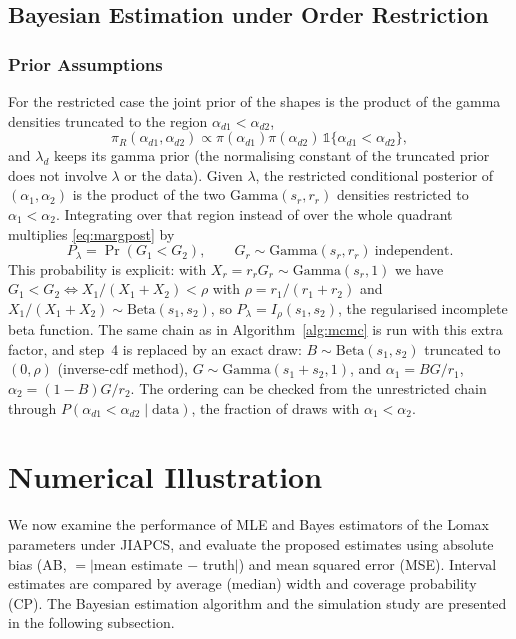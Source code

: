 \documentclass[a4paper,11pt]{article}
\begin{document}
\subsection{Bayesian Estimation under Order Restriction}\label{sec:restbayes}
\subsubsection{Prior Assumptions}
For the restricted case the joint prior of the shapes is the product of the gamma densities truncated to the region $\alpha_{d1}<\alpha_{d2}$,
\[
\pi_R(\alpha_{d1},\alpha_{d2})\propto\pi(\alpha_{d1})\pi(\alpha_{d2})\,\mathbb 1\{\alpha_{d1}<\alpha_{d2}\},
\]
and $\lambda_d$ keeps its gamma prior (the normalising constant of the truncated prior does not involve $\lambda$ or the data). Given $\lambda$, the restricted conditional posterior of $(\alpha_1,\alpha_2)$ is the product of the two $\mathrm{Gamma}(s_r,r_r)$ densities restricted to $\alpha_1<\alpha_2$. Integrating over that region instead of over the whole quadrant multiplies \eqref{eq:margpost} by
\[
P_\lambda=\Pr(G_1<G_2),\qquad G_r\sim\mathrm{Gamma}(s_r,r_r)\ \text{independent}.
\]
This probability is explicit: with $X_r=r_rG_r\sim\mathrm{Gamma}(s_r,1)$ we have $G_1<G_2\iff X_1/(X_1+X_2)<\rho$ with $\rho=r_1/(r_1+r_2)$ and $X_1/(X_1+X_2)\sim\mathrm{Beta}(s_1,s_2)$, so $P_\lambda=I_\rho(s_1,s_2)$, the regularised incomplete beta function. The same chain as in Algorithm~\ref{alg:mcmc} is run with this extra factor, and step~4 is replaced by an exact draw: $B\sim\mathrm{Beta}(s_1,s_2)$ truncated to $(0,\rho)$ (inverse-cdf method), $G\sim\mathrm{Gamma}(s_1+s_2,1)$, and $\alpha_1=BG/r_1$, $\alpha_2=(1-B)G/r_2$. The ordering can be checked from the unrestricted chain through $P(\alpha_{d1}<\alpha_{d2}\mid\text{data})$, the fraction of draws with $\alpha_1<\alpha_2$.

\section{Numerical Illustration}\label{sec5}
We now examine the performance of MLE and Bayes estimators of the Lomax parameters under JIAPCS, and evaluate the proposed estimates using absolute bias (AB, $=|$mean estimate $-$ truth$|$) and mean squared error (MSE). Interval estimates are compared by average (median) width and coverage probability (CP). The Bayesian estimation algorithm and the simulation study are presented in the following subsection.
\end{document}
